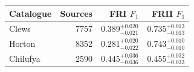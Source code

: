 \begin{tabular}{@{}lrrr@{}}
\toprule
Catalogue & Sources & FRI \(F_1\) & FRII \(F_1\) \\
\midrule
Clews & 7757 & \(0.389_{-0.021}^{+0.020}\) & \(0.735_{-0.013}^{+0.013}\) \\
Horton & 8352 & \(0.281_{-0.022}^{+0.020}\) & \(0.743_{-0.010}^{+0.010}\) \\
Chilufya & 2590 & \(0.445_{-0.036}^{+0.036}\) & \(0.455_{-0.033}^{+0.032}\) \\
\bottomrule
\end{tabular}
